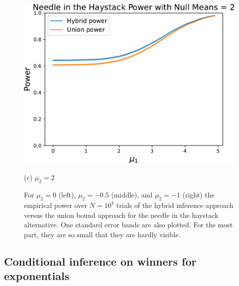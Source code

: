 \documentclass{article}
\begin{document}
\begin{appendix}
\begin{figure}
    \hfill
    \hspace{0.01\textwidth}
    \begin{minipage}{0.32\textwidth}
        \centering
        \includegraphics[width=\textwidth]{fig/hybrid_vs_union_null=2.pdf}
        \caption*{(c) $\mu_2=2$}
    \end{minipage}
    \caption{ For $\mu_2=0$ (left), $\mu_2=-0.5$ (middle), and $\mu_2=-1$ (right) the empirical power over $N=10^4$ trials of the hybrid inference approach versus the union bound approach for the needle in the haystack alternative. One standard error bands are also plotted. For the most part, they are so small that they are hardly visible.  }
    \label{fig:hybrid_union_power}
\end{figure}

\subsection{Conditional inference on winners for exponentials}
\label{sec:exponential_winner_appdx}


\end{appendix}
\end{document}
